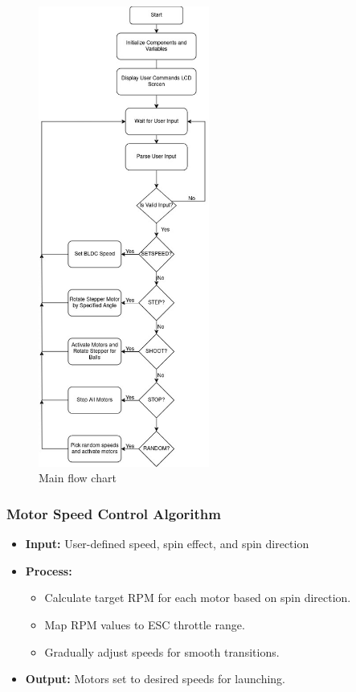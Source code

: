\documentclass[12pt]{report}
\begin{document}
\begin{figure}[H]
    \centering
    \includegraphics[width=0.5\textwidth]{CH5 figureler/salih figureler/main flow chart.jpg}
    \caption{Main flow chart}
    \label{fig:main flow chart}
\end{figure}

\subsubsection{Motor Speed Control Algorithm}
\begin{itemize}
    \item \textbf{Input:}  User-defined speed, spin effect, and spin direction
    \item  \textbf{Process:}
    \begin{itemize}
        \item Calculate target RPM for each motor based on spin direction.
        \item Map RPM values to ESC throttle range.
        \item Gradually adjust speeds for smooth transitions.
    \end{itemize}
    \item \textbf{Output:} Motors set to desired speeds for launching.
\end{itemize}
\end{document}
